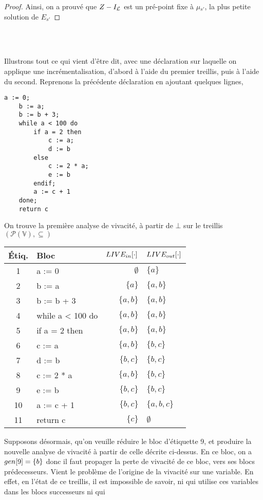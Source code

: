 \documentclass[a4paper, 10pt]{article}
\begin{document}
\begin{proof}
	\noindent
	Ainsi, on a prouvé que $Z - I_{\mathcal{L}}$ est un pré-point fixe à $\mu{}_{s'}$, la plus petite solution de $E_{s'}$
\end{proof}
\\
\\
\begin{example}
Illustrons tout ce qui vient d'être dit, avec une déclaration sur laquelle on applique une incrémentalisation, d'abord à l'aide du premier
treillis, puis à l'aide du second. Reprenons la précédente déclaration en ajoutant quelques lignes,
\begin{lstlisting}[tabsize=2]
	a := 0;
	b := a;
	b := b + 3;
	while a < 100 do
		if a = 2 then
			c := a;
			d := b
		else
			c := 2 * a;
			e := b
		endif;
		a := c + 1
	done;
	return c
\end{lstlisting}
On trouve la première analyse de vivacité, à partir de $\bot$ sur le treillis $(\mathcal{P}(\mathbb{V}), \subseteq)$
\begin{center}
	\begin{tabular}{||c|l|r|l||}
	\hline
	Étiq. & Bloc & $LIVE_{in}[\cdot]$ & $LIVE_{out}[\cdot]$ \\
	\hline
	1 & a := 0 & $\emptyset$ & $\{a\}$\\
	2 & b := a & $\{a\}$ & $\{a, b\}$\\
	3 & b := b + 3 & $\{a, b\}$ & $\{a, b\}$\\
	4 & while a < 100 do & $\{a, b\}$ & $\{a, b\}$\\
	5 & if a = 2 then & $\{a, b\}$ & $\{a, b\}$\\
	6 & c := a & $\{a, b\}$ & $\{b, c\}$\\
	7 & d := b & $\{b, c\}$ & $\{b, c\}$\\
	8 & c := 2 * a & $\{a, b\}$ & $\{b, c\}$\\
	9 & e := b & $\{b, c\}$ & $\{b, c\}$\\
	10 & a := c + 1 & $\{b, c\}$ & $\{a, b, c\}$\\
	11 & return c & $\{c\}$ & $\emptyset$\\
	\hline
	\end{tabular}
\end{center}
Supposons désormais, qu'on veuille réduire le bloc d'étiquette 9, et produire la nouvelle analyse de vivacité
à partir de celle décrite ci-dessus. En ce bloc, on a $gen[9] = \{b\}$ donc il faut propager la perte de vivacité
de ce bloc, vers ses blocs prédecesseurs. Vient le problème de l'origine de la vivacité sur une variable. En effet,
en l'état de ce treillis, il est impossible de savoir, ni qui utilise ces variables dans les blocs successeurs ni qui

\end{example}
\end{document}
